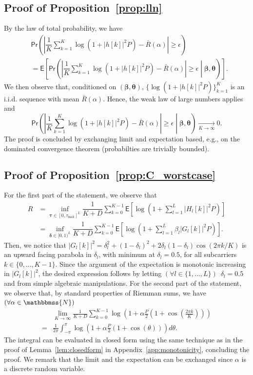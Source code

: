 \documentclass[10pt,journal,a4paper]{IEEEtran}
\newcommand{\E}{\mathsf{E}}		%
\renewcommand{\P}{\mathsf{Pr}} 			%
\newcommand{\stdset}[1]{\mathbbmss{#1}}	%
\renewcommand{\vec}[1]{\bm{#1}}		%
\begin{document}
\subsection{Proof of Proposition~\ref{prop:lln}}
\label{proof:lln}
By the law of total probability, we have
\begin{align*}
&\P\left(\left|\dfrac{1}{K}\sum_{k=1}^{K}\log(1+|h[k]|^2P)-\bar{R}(\alpha) \right|\geq \epsilon\right)\\
&=\E\left[\P\left(\left|\dfrac{1}{K}\sum_{k=1}^{K}\log(1+|h[k]|^2P)-\bar{R}(\alpha) \right|\geq \epsilon \middle| \vec{\beta},\vec{\theta}\right) \right].
\end{align*}
We then observe that, conditioned on $(\vec{\beta},\vec{\theta})$, $\{\log(1+|h[k]|^2P)\}_{k=1}^K$ is an i.i.d. sequence with mean $\bar{R}(\alpha)$. Hence, the weak law of large numbers applies and 
\begin{equation*}
\P\left(\left|\dfrac{1}{K}\sum_{k=1}^{K}\log(1+|h[k]|^2P)-\bar{R}(\alpha) \right|\geq \epsilon \middle| \vec{\beta},\vec{\theta}\right) \underset{K\to \infty}{\to} 0.
\end{equation*}
The proof is concluded by exchanging limit and expectation based, e.g., on the dominated convergence theorem (probabilties are trivially bounded). 

\subsection{Proof of Proposition~\ref{prop:C_worstcase}}
\label{proof:C_worstcase}
For the first part of the statement, we  observe that
\begin{align*}
R &= \inf_{\vec{\tau}\in[0,\tau_{\max}]^L}\dfrac{1}{K+D}\sum_{k=0}^{K-1}\E\left[\log\left(1+\sum_{l=1}^L|H_l[k]|^2P\right)\right]\\
&= \inf_{\vec{\delta}\in[0,1)^L}\dfrac{1}{K+D}\sum_{k=0}^{K-1}\E\left[\log\left(1+\sum_{l=1}^L\beta_l|G_l[k]|^2P\right)\right].
\end{align*}
Then, we notice that $|G_l[k]|^2=
\delta_l^2 + (1-\delta_l)^2 + 2\delta_l(1-\delta_l)\cos(2\pi k/K)$ is an upward facing parabola in $\delta_l$, with minimum at $\delta_l = 0.5$, for all subcarriers $k\in \{0,\ldots,K-1\}$. Since the argument of the expectation is monotonic increasing in $|G_l[k]|^2$, the desired expression follows by letting $(\forall l \in \{1,\ldots,L\})$~$\delta_l=0.5$ and from simple algebraic manipulations. For the second part of the statement, we observe that, by standard properties of Riemman sums, we have $(\forall \alpha \in \stdset{N})$
\begin{align*}
&\lim_{K\to \infty} \frac{1}{K+D}\sum_{k=0}^{K-1} \log\left(1+\alpha \frac{P}{2}\left(1+\cos\left(\frac{2\pi k}{K}\right)\right)\right)\\
=&\frac{1}{2\pi}\int_{-\pi}^\pi\log\left(1+\alpha \frac{P}{2}\left(1+\cos\left(\theta\right)\right)\right)d\theta. 
\end{align*}
The integral can be evaluated in closed form using the same technique as in the proof of Lemma~\ref{lem:closedform} in Appendix~\ref{app:monotonicity}, concluding the proof. We remark that the limit and the expectation can be exchanged since $\alpha$ is a discrete random variable.
\end{document}
